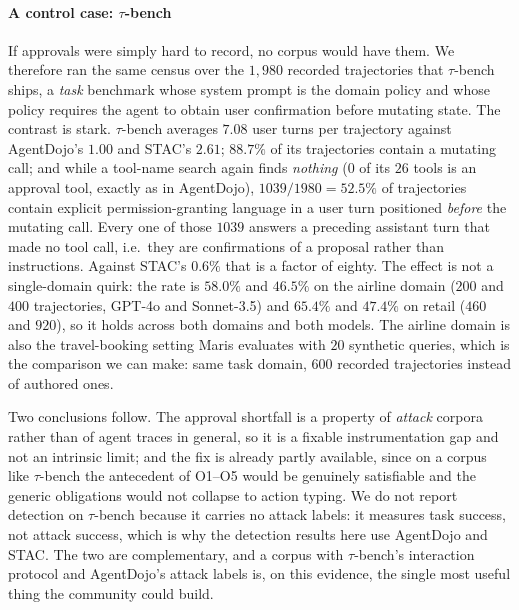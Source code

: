 \documentclass[sigconf]{acmart}
\begin{document}
\paragraph{A control case: $\tau$-bench} If approvals were simply hard to record, no
corpus would have them. We therefore ran the same census over the $1{,}980$ recorded
trajectories that $\tau$-bench~\cite{taubench2024} ships, a \emph{task} benchmark whose
system prompt is the domain policy and whose policy requires the agent to obtain user
confirmation before mutating state. The contrast is stark. $\tau$-bench averages $7.08$
user turns per trajectory against AgentDojo's $1.00$ and STAC's $2.61$; $88.7\%$ of its
trajectories contain a mutating call; and while a tool-name search again finds
\emph{nothing} ($0$ of its $26$ tools is an approval tool, exactly as in AgentDojo),
$1039/1980 = 52.5\%$ of trajectories contain explicit permission-granting language in a
user turn positioned \emph{before} the mutating call. Every one of those $1039$ answers a
preceding assistant turn that made no tool call, i.e.\ they are confirmations of a
proposal rather than instructions. Against STAC's $0.6\%$ that is a factor of eighty. The effect is not a
single-domain quirk: the rate is $58.0\%$ and $46.5\%$ on the airline domain
($200$ and $400$ trajectories, GPT-4o and Sonnet-3.5) and $65.4\%$ and $47.4\%$ on
retail ($460$ and $920$), so it holds across both domains and both models. The airline
domain is also the travel-booking setting Maris evaluates with $20$ synthetic queries,
which is the comparison we can make: same task domain, $600$ recorded trajectories
instead of authored ones.

Two conclusions follow. The approval shortfall is a property of \emph{attack} corpora
rather than of agent traces in general, so it is a fixable instrumentation gap and not an
intrinsic limit; and the fix is already partly available, since on a corpus like
$\tau$-bench the antecedent of O1--O5 would be genuinely satisfiable and the generic
obligations would not collapse to action typing. We do not report detection on
$\tau$-bench because it carries no attack labels: it measures task success, not attack
success, which is why the detection results here use AgentDojo and STAC. The two are
complementary, and a corpus with $\tau$-bench's interaction protocol and AgentDojo's
attack labels is, on this evidence, the single most useful thing the community could
build.
\end{document}

